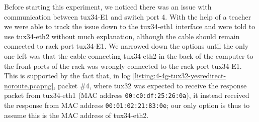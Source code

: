 \documentclass[a4paper, 11pt]{report}
\begin{document}
Before starting this experiment, we noticed there was an issue with communication between tux34-E1 and switch port 4.
With the help of a teacher we were able to track the issue down to the tux34-eth1 interface and were told to use tux34-eth2 without much explanation, although the cable should remain connected to rack port tux34-E1.
We narrowed down the options until the only one left was that the cable connecting tux34-eth2 in the back of the computer to the front ports of the rack was wrongly connected to the rack port tux34-E1.
This is supported by the fact that, in log \ref{listing:4-4g-tux32-yesredirect-noroute.pcapng}, packet \#4, where tux32 was expected to receive the response packet from tux34-eth1 (MAC address \texttt{00:c0:df:25:26:0a}), it instead received the response from MAC address \texttt{00:01:02:21:83:0e}; our only option is thus to assume this is the MAC address of tux34-eth2.
\end{document}
